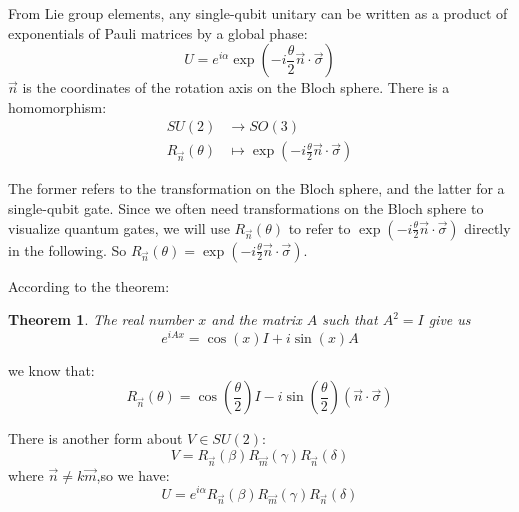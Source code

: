 \documentclass[a4paper,10pt]{article}
\newtheorem{theorem}{Theorem}[subsection]
\numberwithin{equation}{subsection}
\begin{document}
From Lie group elements, any single-qubit unitary can be written as a product of exponentials of Pauli matrices by a global phase:
\begin{equation}
    U = e^{i\alpha}\exp\left(-i\frac{\theta}{2}\vec{n}\cdot\vec{\sigma}\right)
\end{equation}
$\vec{n}$ is the coordinates of the rotation axis on the Bloch sphere.
There is a homomorphism:
\begin{equation}
    \begin{split}
        SU(2)               & \to SO(3)
        \\
        R_{\vec{n}}(\theta) & \mapsto \exp\left(-i\frac{\theta}{2}\vec{n}\cdot\vec{\sigma}\right)
    \end{split}
\end{equation}

The former refers to the transformation on the Bloch sphere, and the latter for a single-qubit gate. Since we often need transformations on the Bloch sphere to visualize quantum gates, we will use $R_{\vec{n}}(\theta)$ to refer to $\exp\left(-i\frac{\theta}{2}\vec{n}\cdot\vec{\sigma}\right)$ directly in the following. So $R_{\vec{n}}(\theta) = \exp\left(-i\frac{\theta}{2}\vec{n}\cdot\vec{\sigma}\right)$.

According to the theorem:
\begin{theorem}
    The real number $x$ and the matrix $A$ such that $A^2=I$ give us
    \begin{equation}
        e^{iAx}=\cos (x)I+i\sin (x)A
    \end{equation}
\end{theorem}

we know that:
\begin{equation}
    R_{\vec{n}}(\theta)=\cos \left(\frac{\theta}{2}\right)I-i\sin \left(\frac{\theta}{2}\right)(\vec{n}\cdot\vec{\sigma})
\end{equation}


There is another form about $V\in SU(2)$:
\begin{equation}
    V=R_{\vec{n}}(\beta)R_{\vec{m}}(\gamma)R_{\vec{n}}(\delta)
\end{equation}
where $\vec{n}\neq k\vec{m}$,so we have:
\begin{equation}\label{EulerAngle}
    U=e^{i\alpha}R_{\vec{n}}(\beta)R_{\vec{m}}(\gamma)R_{\vec{n}}(\delta)
\end{equation}
\end{document}
